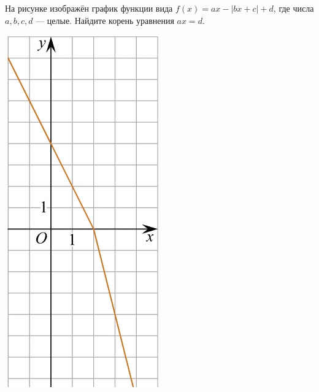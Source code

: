 \begin{class}[number=6]
\begin{minipage}[c]{0.1\textwidth}
		\end{minipage}
		\item
		\begin{minipage}[t]{0.43\textwidth}
			На рисунке изображён график функции вида \(f(x)=ax-|bx+c|+d\), где числа \(a, b, c, d\) --- целые. Найдите корень уравнения \(ax=d\).
		\end{minipage}
		\begin{minipage}[c]{0.1\textwidth}
			\includegraphics[align=t, width=\textwidth]{pics/G111M4C6-1.jpg}

\end{minipage}
\end{class}
